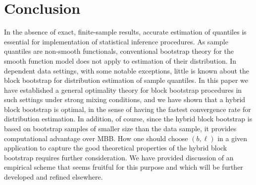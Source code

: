 \documentclass[a4paper, 12pt]{article}
\theoremstyle{plain}
\theoremstyle{definition}
\begin{document}
\section{Conclusion}
\label{sec:conclusion}

In the absence of exact, finite-sample results, accurate estimation of quantiles is essential for implementation of statistical inference procedures. As sample quantiles are non-smooth functionals, conventional bootstrap theory for the smooth function model does not apply to estimation of their distribution. In dependent data settings, with some notable exceptions, little is known about the block bootstrap for distribution estimation of sample quantiles. In this paper we have established a general optimality theory for block bootstrap procedures in such settings under strong mixing conditions, and we have shown that a hybrid block bootstrap is optimal, in the sense of having the fastest convergence rate for distribution estimation. In addition, of course, since the hybrid block bootstrap is based on bootstrap samples of smaller size than the data sample, it provides computational advantage over MBB. How one should choose $(b,\ell)$ in a given application to capture the good theoretical properties of the hybrid block bootstrap requires further consideration. We have provided discussion of an empirical scheme that seems fruitful for this purpose and which will be further developed and refined elsewhere.



\end{document}

